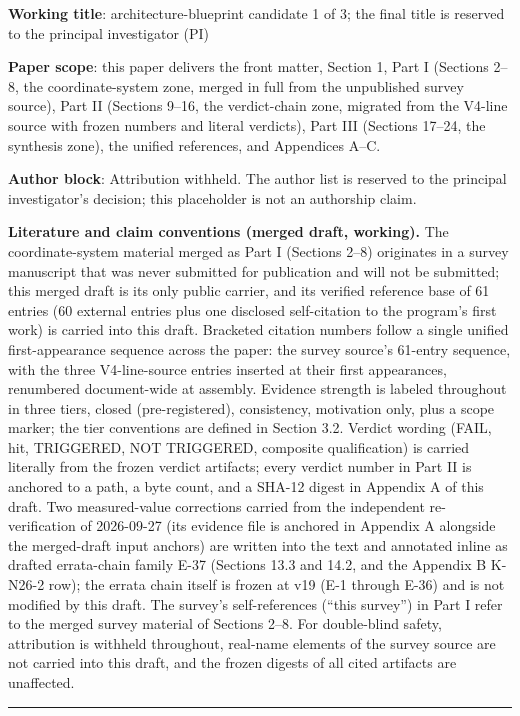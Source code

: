 \documentclass[11pt]{article}
\begin{document}
\noindent \textbf{Working title}: architecture-blueprint candidate 1 of 3; the final title is reserved to the principal investigator (PI)\par\smallskip
\noindent \textbf{Paper scope}: this paper delivers the front matter, Section 1, Part I (Sections 2–8, the coordinate-system zone, merged in full from the unpublished survey source), Part II (Sections 9–16, the verdict-chain zone, migrated from the V4-line source with frozen numbers and literal verdicts), Part III (Sections 17–24, the synthesis zone), the unified references, and Appendices A–C.\par\smallskip
\noindent \textbf{Author block}: Attribution withheld. The author list is reserved to the principal investigator's decision; this placeholder is not an authorship claim.\par\smallskip
\noindent \textbf{Literature and claim conventions (merged draft, working).} The coordinate-system material merged as Part I (Sections 2–8) originates in a survey manuscript that was never submitted for publication and will not be submitted; this merged draft is its only public carrier, and its verified reference base of 61 entries (60 external entries plus one disclosed self-citation to the program's first work) is carried into this draft. Bracketed citation numbers follow a single unified first-appearance sequence across the paper: the survey source's 61-entry sequence, with the three V4-line-source entries inserted at their first appearances, renumbered document-wide at assembly. Evidence strength is labeled throughout in three tiers, closed (pre-registered), consistency, motivation only, plus a scope marker; the tier conventions are defined in Section 3.2. Verdict wording (FAIL, hit, TRIGGERED, NOT TRIGGERED, composite qualification) is carried literally from the frozen verdict artifacts; every verdict number in Part II is anchored to a path, a byte count, and a SHA-12 digest in Appendix A of this draft. Two measured-value corrections carried from the independent re-verification of 2026-09-27 (its evidence file is anchored in Appendix A alongside the merged-draft input anchors) are written into the text and annotated inline as drafted errata-chain family E-37 (Sections 13.3 and 14.2, and the Appendix B K-N26-2 row); the errata chain itself is frozen at v19 (E-1 through E-36) and is not modified by this draft. The survey's self-references (``this survey'') in Part I refer to the merged survey material of Sections 2–8. For double-blind safety, attribution is withheld throughout, real-name elements of the survey source are not carried into this draft, and the frozen digests of all cited artifacts are unaffected.\par
\vspace{0.5em}\hrule\vspace{0.8em}
\end{document}

